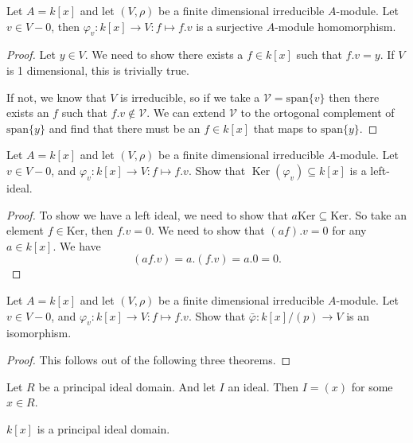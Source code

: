 \begin{prop}
Let $A=k[x]$ and let $(V,\rho )$ be a finite dimensional irreducible $A$-module. Let $v\in V-0$, then $\varphi _{v}: k[x]\rightarrow V : f \mapsto f.v$ is a surjective $A$-module homomorphism.
\end{prop}

\begin{proof}
Let $y\in V$. We need to show there exists a $f\in k[x]$ such that $f.v=y$. If $V$ is 1 dimensional, this is trivially true.

If not, we know that $V$ is irreducible, so if we take a $\mathcal{V}=\text{span}\{v\}$ then there exists an $f$ such that $f.v \not\in  \mathcal{V}$. We can extend $\mathcal{V}$ to the ortogonal complement of $\text{span}\{y\}$ and find that there must be an $f\in k[x]$ that maps to $\text{span}\{y\}$.
\end{proof}

\begin{prop}
Let $A=k[x]$ and let $(V,\rho )$ be a finite dimensional irreducible $A$-module. Let $v\in V-0$, and $\varphi _{v}: k[x]\rightarrow V : f \mapsto f.v$. Show that $\mathop{\mathrm{Ker}}(\varphi _{v})\subseteq k[x]$ is a left-ideal.
\end{prop}

\begin{proof}
To show we have a left ideal, we need to show that $a\text{Ker}\subseteq \text{Ker}$. So take an element $f\in \text{Ker}$, then $f.v=0$. We need to show that $(af).v=0$ for any $a\in k[x]$. We have 
$$(af.v)=a.(f.v)=a.0=0.$$
\end{proof}

\begin{prop}
Let $A=k[x]$ and let $(V,\rho )$ be a finite dimensional irreducible $A$-module. Let $v\in V-0$, and $\varphi _{v}: k[x]\rightarrow V : f \mapsto f.v$. Show that $\bar{\varphi }: k[x]/(p) \rightarrow V$ is an isomorphism.
\end{prop}

\begin{proof}
This follows out of the following three theorems.
\end{proof}

\begin{thm}
Let $R$ be a principal ideal domain. And let $I$ an ideal. Then $I=(x)$ for some $x\in R$.
\end{thm}

\begin{thm}
$k[x]$ is a principal ideal domain.
\end{thm}

